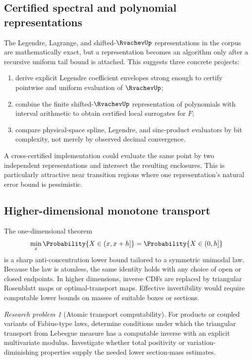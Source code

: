 \documentclass[11pt,oneside]{article}
\theoremstyle{definition}
\theoremstyle{remark}
\numberwithin{equation}{section}
\newtheorem{problem}[theorem]{Research problem}
\begin{document}
\subsection{Certified spectral and polynomial representations}

The Legendre, Lagrange, and shifted-$\RvachevUp$ representations in the corpus are
mathematically exact, but a representation becomes an algorithm only after a
recursive uniform tail bound is attached.  This suggests three concrete
projects:

\begin{enumerate}
\item derive explicit Legendre coefficient envelopes strong enough to certify
      pointwise and uniform evaluation of $\RvachevUp$;
\item combine the finite shifted-$\RvachevUp$ representation of polynomials with
      interval arithmetic to obtain certified local surrogates for $F$;
\item compare physical-space spline, Legendre, and sinc-product evaluators by
      bit complexity, not merely by observed decimal convergence.
\end{enumerate}

A cross-certified implementation could evaluate the same point by two
independent representations and intersect the resulting enclosures.  This is
particularly attractive near transition regions where one representation's
natural error bound is pessimistic.

\subsection{Higher-dimensional monotone transport}

The one-dimensional theorem
\[
 \min_x \Probability\{X\in(x,x+h]\}=\Probability\{X\in(0,h]\}
\]
is a sharp anti-concentration lower bound tailored to a symmetric unimodal
law.  Because the law is atomless, the same identity holds with any choice of
open or closed endpoints.  In higher dimensions, inverse CDFs are replaced by
triangular Rosenblatt maps or optimal-transport maps.  Effective invertibility
would require computable lower bounds on masses of suitable boxes or sections.

\begin{problem}[Atomic transport computability]
For products or coupled variants of Fabius-type laws, determine conditions
under which the triangular transport from Lebesgue measure has a computable
inverse with an explicit multivariate modulus.  Investigate whether total
positivity or variation-diminishing properties supply the needed lower
section-mass estimates.
\end{problem}
\end{document}
